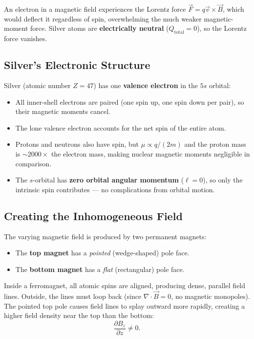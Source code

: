 \documentclass[11pt,a4paper]{article}
\theoremstyle{definition}
\theoremstyle{plain}
\theoremstyle{remark}
\begin{document}
An electron in a magnetic field experiences the Lorentz force $\vec{F} = q\vec{v}\times\vec{B}$, which would deflect it regardless of spin, overwhelming the much weaker magnetic-moment force. Silver atoms are \textbf{electrically neutral} ($Q_{\text{total}} = 0$), so the Lorentz force vanishes.

\subsection{Silver's Electronic Structure}

Silver (atomic number $Z = 47$) has one \textbf{valence electron} in the $5s$ orbital:
\begin{itemize}
    \item All inner-shell electrons are paired (one spin up, one spin down per pair), so their magnetic moments cancel.
    \item The lone valence electron accounts for the net spin of the entire atom.
    \item Protons and neutrons also have spin, but $\mu \propto q/(2m)$ and the proton mass is $\sim\!2000\times$ the electron mass, making nuclear magnetic moments negligible in comparison.
    \item The $s$-orbital has \textbf{zero orbital angular momentum} ($\ell = 0$), so only the intrinsic spin contributes --- no complications from orbital motion.
\end{itemize}

\subsection{Creating the Inhomogeneous Field}

The varying magnetic field is produced by two permanent magnets:
\begin{itemize}
    \item The \textbf{top magnet} has a \emph{pointed} (wedge-shaped) pole face.
    \item The \textbf{bottom magnet} has a \emph{flat} (rectangular) pole face.
\end{itemize}

Inside a ferromagnet, all atomic spins are aligned, producing dense, parallel field lines. Outside, the lines must loop back (since $\nabla\cdot\vec{B} = 0$, no magnetic monopoles). The pointed top pole causes field lines to splay outward more rapidly, creating a higher field density near the top than the bottom:
\[
    \frac{\partial B_z}{\partial z} \neq 0.
\]
\end{document}
